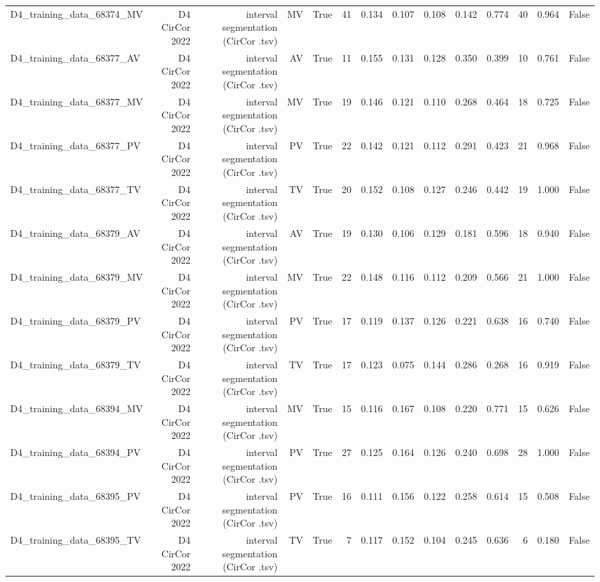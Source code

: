 \begin{table}[htbp]
\begin{tabular}{lrrrrrrrrrrrrr}
    D4\_training\_data\_68374\_MV & D4 CirCor 2022 & interval segmentation (CirCor .tsv) & MV & True & 41 & 0.134 & 0.107 & 0.108 & 0.142 & 0.774 & 40 & 0.964 & False \\
    D4\_training\_data\_68377\_AV & D4 CirCor 2022 & interval segmentation (CirCor .tsv) & AV & True & 11 & 0.155 & 0.131 & 0.128 & 0.350 & 0.399 & 10 & 0.761 & False \\
    D4\_training\_data\_68377\_MV & D4 CirCor 2022 & interval segmentation (CirCor .tsv) & MV & True & 19 & 0.146 & 0.121 & 0.110 & 0.268 & 0.464 & 18 & 0.725 & False \\
    D4\_training\_data\_68377\_PV & D4 CirCor 2022 & interval segmentation (CirCor .tsv) & PV & True & 22 & 0.142 & 0.121 & 0.112 & 0.291 & 0.423 & 21 & 0.968 & False \\
    D4\_training\_data\_68377\_TV & D4 CirCor 2022 & interval segmentation (CirCor .tsv) & TV & True & 20 & 0.152 & 0.108 & 0.127 & 0.246 & 0.442 & 19 & 1.000 & False \\
    D4\_training\_data\_68379\_AV & D4 CirCor 2022 & interval segmentation (CirCor .tsv) & AV & True & 19 & 0.130 & 0.106 & 0.129 & 0.181 & 0.596 & 18 & 0.940 & False \\
    D4\_training\_data\_68379\_MV & D4 CirCor 2022 & interval segmentation (CirCor .tsv) & MV & True & 22 & 0.148 & 0.116 & 0.112 & 0.209 & 0.566 & 21 & 1.000 & False \\
    D4\_training\_data\_68379\_PV & D4 CirCor 2022 & interval segmentation (CirCor .tsv) & PV & True & 17 & 0.119 & 0.137 & 0.126 & 0.221 & 0.638 & 16 & 0.740 & False \\
    D4\_training\_data\_68379\_TV & D4 CirCor 2022 & interval segmentation (CirCor .tsv) & TV & True & 17 & 0.123 & 0.075 & 0.144 & 0.286 & 0.268 & 16 & 0.919 & False \\
    D4\_training\_data\_68394\_MV & D4 CirCor 2022 & interval segmentation (CirCor .tsv) & MV & True & 15 & 0.116 & 0.167 & 0.108 & 0.220 & 0.771 & 15 & 0.626 & False \\
    D4\_training\_data\_68394\_PV & D4 CirCor 2022 & interval segmentation (CirCor .tsv) & PV & True & 27 & 0.125 & 0.164 & 0.126 & 0.240 & 0.698 & 28 & 1.000 & False \\
    D4\_training\_data\_68395\_PV & D4 CirCor 2022 & interval segmentation (CirCor .tsv) & PV & True & 16 & 0.111 & 0.156 & 0.122 & 0.258 & 0.614 & 15 & 0.508 & False \\
    D4\_training\_data\_68395\_TV & D4 CirCor 2022 & interval segmentation (CirCor .tsv) & TV & True & 7 & 0.117 & 0.152 & 0.104 & 0.245 & 0.636 & 6 & 0.180 & False \\

\end{tabular}
\end{table}
